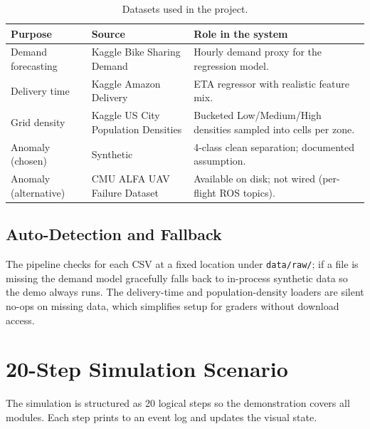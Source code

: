 \documentclass[11pt,a4paper]{article}
\begin{document}
\begin{table}[H]
\centering
\caption{Datasets used in the project.}
\begin{tabular}{@{}llp{6cm}@{}}
\toprule
\textbf{Purpose} & \textbf{Source} & \textbf{Role in the system} \\
\midrule
Demand forecasting   & Kaggle Bike Sharing Demand            & Hourly demand proxy for the regression model. \\
Delivery time        & Kaggle Amazon Delivery                & ETA regressor with realistic feature mix. \\
Grid density         & Kaggle US City Population Densities   & Bucketed Low/Medium/High densities sampled into cells per zone. \\
Anomaly (chosen)     & Synthetic                              & 4-class clean separation; documented assumption. \\
Anomaly (alternative)& CMU ALFA UAV Failure Dataset           & Available on disk; not wired (per-flight ROS topics). \\
\bottomrule
\end{tabular}
\end{table}

\subsection{Auto-Detection and Fallback}
The pipeline checks for each CSV at a fixed location under
\texttt{data/raw/}; if a file is missing the demand model gracefully
falls back to in-process synthetic data so the demo always runs. The
delivery-time and population-density loaders are silent no-ops on
missing data, which simplifies setup for graders without download
access.

\section{20-Step Simulation Scenario}
\label{sec:scenario}

The simulation is structured as 20 logical steps so the demonstration
covers all modules. Each step prints to an event log and updates the
visual state.
\end{document}
